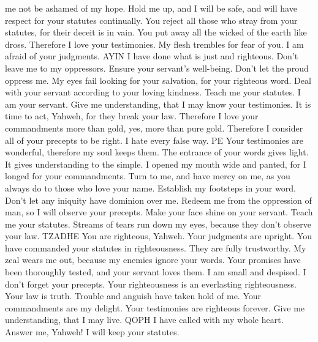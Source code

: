 me not be ashamed of my hope.  Hold me up, and I will be
safe, and will have respect for your statutes continually.
 You reject all those who stray from your statutes, for
their deceit is in vain.  You put away all the wicked of
the earth like dross. Therefore I love your testimonies.
 My flesh trembles for fear of you. I am afraid of your
judgments. AYIN  I have done what is just and righteous.
Don't leave me to my oppressors.  Ensure your servant's
well-being. Don't let the proud oppress me.  My eyes
fail looking for your salvation, for your righteous word.
 Deal with your servant according to your loving
kindness. Teach me your statutes.  I am your servant.
Give me understanding, that I may know your testimonies.
 It is time to act, Yahweh, for they break your law.
 Therefore I love your commandments more than gold, yes,
more than pure gold.  Therefore I consider all of your
precepts to be right. I hate every false way. PE  Your
testimonies are wonderful, therefore my soul keeps them.
 The entrance of your words gives light. It gives
understanding to the simple.  I opened my mouth wide and
panted, for I longed for your commandments.  Turn to me,
and have mercy on me, as you always do to those who love your name.
 Establish my footsteps in your word. Don't let any
iniquity have dominion over me.  Redeem me from the
oppression of man, so I will observe your precepts. 
Make your face shine on your servant. Teach me your statutes.
 Streams of tears run down my eyes, because they don't
observe your law. TZADHE  You are righteous, Yahweh.
Your judgments are upright.  You have commanded your
statutes in righteousness. They are fully trustworthy. 
My zeal wears me out, because my enemies ignore your words.
 Your promises have been thoroughly tested, and your
servant loves them.  I am small and despised. I don't
forget your precepts.  Your righteousness is an
everlasting righteousness. Your law is truth.  Trouble
and anguish have taken hold of me. Your commandments are my delight.
 Your testimonies are righteous forever. Give me
understanding, that I may live. QOPH  I have called with
my whole heart. Answer me, Yahweh! I will keep your statutes.

